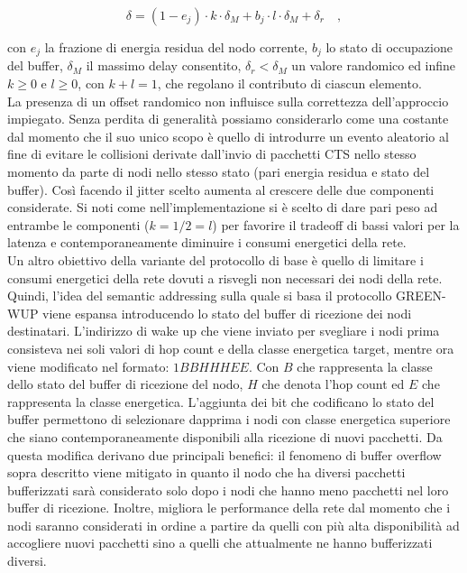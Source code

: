 \documentclass{report}
\begin{document}
$$ \delta= (1-e_{j}) \cdot k \cdot \delta_{M} + b_{j} \cdot l \cdot \delta_{M} + \delta_{r} \quad ,$$

con $e_{j}$ la frazione di energia residua del nodo corrente, $b_{j}$ lo stato di occupazione del buffer, $\delta_{M}$ il massimo delay consentito,
$\delta_{r} < \delta_{M}$ un valore randomico ed infine $k \geq 0$ e $l \geq 0$, con $k+l=1$, che regolano il contributo di ciascun elemento.\\

La presenza di un offset randomico non influisce sulla correttezza dell'approccio impiegato. Senza perdita di generalità possiamo considerarlo come una
costante dal momento che il suo unico scopo è quello di introdurre un evento aleatorio al fine di evitare le collisioni derivate dall'invio di pacchetti CTS
nello stesso momento da parte di nodi nello stesso stato (pari energia residua e stato del buffer). Così facendo il jitter scelto aumenta al crescere
delle due componenti considerate. Si noti come nell'implementazione si è scelto di dare pari peso ad entrambe le componenti ($k=1/2=l$) per favorire il
tradeoff di bassi valori per la latenza e contemporaneamente diminuire i consumi energetici della rete.\\

Un altro obiettivo della variante del protocollo di base è quello di limitare i consumi energetici della rete dovuti a risvegli non necessari dei nodi
della rete. Quindi, l'idea del semantic addressing sulla quale si basa il protocollo GREEN-WUP viene espansa introducendo lo stato del buffer di ricezione dei nodi
destinatari. L'indirizzo di wake up che viene inviato per svegliare i nodi prima consisteva nei soli valori di hop count e della classe energetica target, mentre ora
viene modificato nel formato: $1BBHHHEE$. Con $B$ che rappresenta la classe dello stato del buffer di ricezione del nodo, $H$ che denota l'hop count ed
$E$ che rappresenta la classe energetica.
L'aggiunta dei bit che codificano lo stato del buffer permettono di selezionare dapprima i nodi con classe energetica superiore che siano contemporaneamente disponibili
alla ricezione di nuovi pacchetti. Da questa modifica derivano due principali benefici: il fenomeno di buffer overflow sopra descritto viene mitigato in quanto il nodo
che ha diversi pacchetti bufferizzati sarà considerato solo dopo i nodi che hanno meno pacchetti nel loro buffer di ricezione. Inoltre, migliora
le performance della rete dal momento che i nodi saranno considerati in ordine a partire da quelli con più alta disponibilità ad accogliere nuovi pacchetti sino
a quelli che attualmente ne hanno bufferizzati diversi.\\
\end{document}
